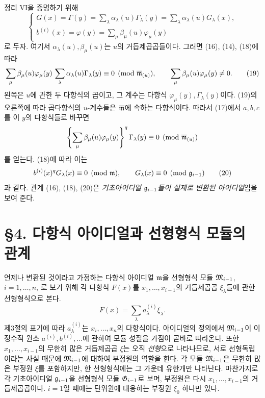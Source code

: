 정리 VI을 증명하기 위해
\begin{equation}
\begin{cases}
G(x)=\Gamma(y)=\sum_\lambda\alpha_\lambda(u)\Gamma_\lambda(y)
=\sum_\lambda\alpha_\lambda(u)G_\lambda(x),\\
b^{(i)}(x)=\varphi(y)=\sum_\mu\beta_\mu(u)\varphi_\mu(y)
\end{cases}
\tag{18}
\end{equation}
로 두자. 여기서 \(\alpha_\lambda(u),\beta_\mu(u)\)는 \(u\)의 거듭제곱곱들이다. 그러면 (16), (14), (18)에 따라
\begin{equation}
\sum_\mu\beta_\mu(u)\varphi_\mu(y)\,
\sum_\lambda\alpha_\lambda(u)\Gamma_\lambda(y)
\equiv0\pmod{\overline{\mathfrak m}_{(u)}},
\qquad
\sum_\mu\beta_\mu(u)\varphi_\mu(y)\ne0.
\tag{19}
\end{equation}
왼쪽은 \(u\)에 관한 두 다항식의 곱이고, 그 계수는 다항식 \(\varphi_\mu(y),\Gamma_\lambda(y)\)이다. (19)의 오른쪽에 따라 곱다항식의 \(u\)-계수들은 \(\overline{\mathfrak m}\)에 속하는 다항식이다. 따라서 (17)에서 \(a,b,c\)를 이 \(y\)의 다항식들로 바꾸면
\[
\left\{\sum_\mu\beta_\mu(u)\varphi_\mu(y)\right\}^{q}
\Gamma_\lambda(y)\equiv0\pmod{\overline{\mathfrak m}_{(u)}
}
\]
를 얻는다. (18)에 따라 이는
\begin{equation}
b^{(i)}(x)^qG_\lambda(x)\equiv0\pmod{\mathfrak m},
\qquad
G_\lambda(x)\equiv0\pmod{\mathfrak g_{i-1}}
\tag{20}
\end{equation}
과 같다. 관계 (16), (18), (20)은 \emph{기초아이디얼 \(\mathfrak g_{i-1}\)들이 실제로 변환된 아이디얼}임을 보여 준다.

\section*{\S{}4. 다항식 아이디얼과 선형형식 모듈의 관계}

언제나 변환된 것이라고 가정하는 다항식 아이디얼 \(\mathfrak m\)을 선형형식 모듈 \(\mathfrak M_{i-1}\), \(i=1,\ldots,n\), 로 보기 위해 각 다항식 \(F(x)\)를 \(x_1,\ldots,x_{i-1}\)의 거듭제곱곱 \(\xi_\lambda\)들에 관한 선형형식으로 본다.
\[
F(x)=\sum_\lambda a_\lambda^{(i)}\xi_\lambda.
\]
제3절의 표기에 따라 \(a_\lambda^{(i)}\)는 \(x_i,\ldots,x_n\)의 다항식이다. 아이디얼의 정의에서 \(\mathfrak M_{i-1}\)이 이 정수적 원소 \(a^{(i)},b^{(i)},\ldots\)에 관하여 모듈 성질을 가짐이 곧바로 따라온다. 또한 \(x_1,\ldots,x_{i-1}\)의 무한히 많은 거듭제곱곱 \(\xi\)는 오직 \emph{선형}으로 나타나므로, 서로 선형독립이라는 사실 때문에 \(\mathfrak M_{i-1}\)에 대하여 부정원의 역할을 한다. 각 모듈 \(\mathfrak M_{i-1}\)은 무한히 많은 부정원 \(\xi\)를 포함하지만, 한 선형형식에는 그 가운데 유한개만 나타난다. 마찬가지로 각 기초아이디얼 \(\mathfrak g_{i-1}\)을 선형형식 모듈 \(\mathfrak G_{i-1}\)로 보며, 부정원은 다시 \(x_1,\ldots,x_{i-1}\)의 거듭제곱곱이다. \(i=1\)일 때에는 단위원에 대응하는 부정원 \(\xi_0\) 하나만 있다.

